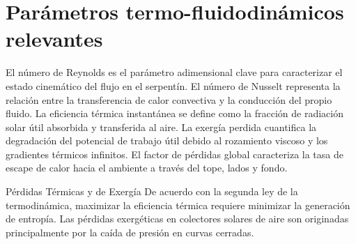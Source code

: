 \section{Parámetros termo-fluidodinámicos relevantes}
\label{sec:cap02_parametros}

El número de Reynolds es el parámetro adimensional clave para caracterizar el estado cinemático del flujo en el serpentín.
El número de Nusselt representa la relación entre la transferencia de calor convectiva y la conducción del propio fluido.
La eficiencia térmica instantánea se define como la fracción de radiación solar útil absorbida y transferida al aire.
La exergía perdida cuantifica la degradación del potencial de trabajo útil debido al rozamiento viscoso y los gradientes térmicos infinitos.
El factor de pérdidas global caracteriza la tasa de escape de calor hacia el ambiente a través del tope, lados y fondo.

\begin{cajaadvertencia}{Pérdidas Térmicas y de Exergía}
De acuerdo con la segunda ley de la termodinámica, maximizar la eficiencia térmica requiere minimizar la generación de entropía.
Las pérdidas exergéticas en colectores solares de aire son originadas principalmente por la caída de presión en curvas cerradas.
\end{cajaadvertencia}
